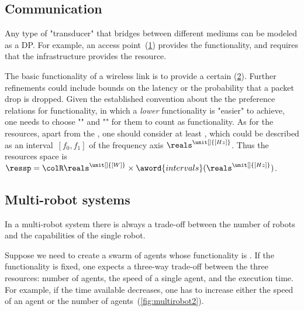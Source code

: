 
\subsection{Communication}

\begin{example}[Transducers]
  Any type of "transducer" that bridges between different
  mediums can be modeled as a DP. For example, an access point~(\cref{fig:accesspoint})
  provides the  functionality, and requires
  that the infrastructure provides the  resource.
\end{example}


\begin{figure}[h]
  \centering
  \caption{\label{fig:accesspoint}}
\end{figure}

\begin{example}
  The basic functionality of a wireless link is to provide
  a certain  (\cref{fig:networklink}). Further refinements could include bounds
  on the latency or the probability that a packet drop is dropped. Given
  the established convention about the the preference relations for
  functionality, in which a \emph{lower} functionality is "easier"
  to achieve, one needs to choose ""
  and "" for them
  to count as functionality. As for the resources, apart from the , one should consider at least ,
  which could be described as an interval~$[f_0,f_1]$ of the frequency
  axis $\reals^{\unit[]{[Hz]}}$. Thus the resources space is $\ressp=\colR\reals^{\unit[]{[W]}}\times\aword{intervals}(\reals^{\unit[]{[Hz]}})$.
\end{example}

\begin{figure}[h]
  \begin{center}
  \end{center}
  \caption{ \label{fig:networklink}}
\end{figure}

\subsection{Multi-robot systems}

In a multi-robot system there is always a trade-off between the number
of robots and the capabilities of the single robot.
\begin{example}
  Suppose we need to create a swarm of agents whose functionality is
  . If the functionality is fixed, one expects
  a three-way trade-off between the three resources: number of agents,
  the speed of a single agent, and the execution time. For example,
  if the time available decreases, one has to increase either the speed
  of an agent or the number of agents~(\cref{fig:multirobot2}).
\end{example}


